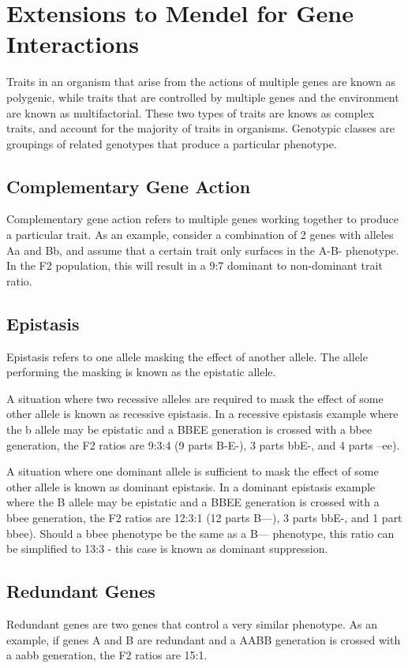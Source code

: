 \documentclass[12pt,titlepage]{article}
\begin{document}
  \newpage

  \section{Extensions to Mendel for Gene Interactions}
    Traits in an organism that arise from the actions of multiple genes are known as polygenic, while traits that are controlled by multiple genes and the environment
    are known as multifactorial. These two types of traits are knows as complex traits, and account for the majority of traits in organisms. Genotypic classes are
    groupings of related genotypes that produce a particular phenotype.

    \subsection{Complementary Gene Action}
      Complementary gene action refers to multiple genes working together to produce a particular trait. As an example, consider a combination of 2 genes with alleles
      Aa and Bb, and assume that a certain trait only surfaces in the A-B- phenotype. In the F2 population, this will result in a 9:7 dominant to non-dominant trait
      ratio.

    \subsection{Epistasis}
      Epistasis refers to one allele masking the effect of another allele. The allele performing the masking is known as the epistatic allele.

      A situation where two recessive alleles are required to mask the effect of some other allele is known as recessive epistasis. In a recessive
      epistasis example where the b allele may be epistatic and a BBEE generation is crossed with a bbee generation, the F2 ratios are 9:3:4 (9 parts B-E-),
      3 parts bbE-, and 4 parts --ee).

      A situation where one dominant allele is sufficient to mask the effect of some other allele is known as dominant epistasis. In a dominant
      epistasis example where the B allele may be epistatic and a BBEE generation is crossed with a bbee generation, the F2 ratios are 12:3:1 (12 parts B---),
      3 parts bbE-, and 1 part bbee). Should a bbee phenotype be the same as a B--- phenotype, this ratio can be simplified to 13:3 - this case is known as
      dominant suppression.

    \subsection{Redundant Genes}
      Redundant genes are two genes that control a very similar phenotype. As an example, if genes A and B are redundant and a AABB generation is crossed
      with a aabb generation, the F2 ratios are 15:1.
\end{document}
